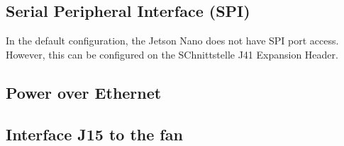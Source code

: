 \subsection{Serial Peripheral Interface (SPI)}

In the default configuration, the Jetson Nano does not have SPI port access. However, this can be configured on the SChnittstelle J41 Expansion Header.



\subsection{Power over Ethernet}

\subsection{Interface J15 to the fan}


